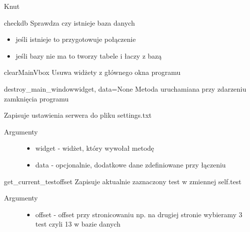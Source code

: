\documentclass[letterpaper,10pt,polish]{manual}
\begin{document}
\begin{classdesc}{Knut}{}
\hypertarget{Knut.Knut.checkdb}{}\begin{methoddesc}{checkdb}{}
Sprawdza czy istnieje baza danych
\begin{itemize}
\item {} 
jeśli istnieje to przygotowuje połączenie

\item {} 
jeśli bazy nie ma to tworzy tabele i łaczy z bazą

\end{itemize}
\end{methoddesc}

\hypertarget{Knut.Knut.clearMainVbox}{}\begin{methoddesc}{clearMainVbox}{}
Usuwa widżety z głównego okna programu
\end{methoddesc}

\hypertarget{Knut.Knut.destroy\_main\_window}{}\begin{methoddesc}{destroy\_main\_window}{widget, data=None}
Metoda uruchamiana przy zdarzeniu zamknięcia programu

Zapisuje ustawienia serwera do pliku settings.txt
\begin{description}
\item[Argumenty] \leavevmode\begin{itemize}
\item {} 
widget - widżet, który wywołał metodę

\item {} 
data - opcjonalnie, dodatkowe dane zdefiniowane przy łączeniu

\end{itemize}

\end{description}
\end{methoddesc}

\hypertarget{Knut.Knut.get\_current\_test}{}\begin{methoddesc}{get\_current\_test}{offset}
Zapisuje aktualnie zaznaczony test w zmiennej self.test
\begin{description}
\item[Argumenty] \leavevmode\begin{itemize}
\item {} 
offset - offset przy stronicowaniu np. na drugiej stronie wybieramy 3 test czyli 13 w bazie danych

\end{itemize}


\end{description}
\end{methoddesc}
\end{classdesc}
\end{document}
